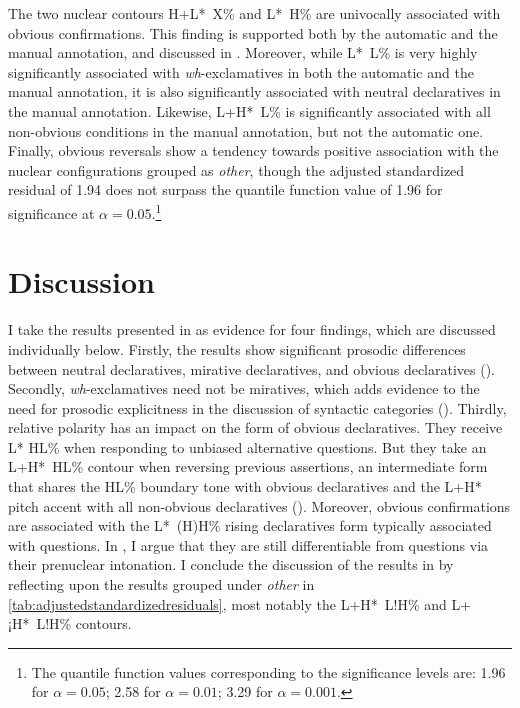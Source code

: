 The two nuclear contours H+L*~X\% and L*~H\% are univocally associated with obvious confirmations. This finding is supported both by the automatic and the manual annotation, and discussed in . Moreover, while L*~L\% is very highly significantly associated with \textit{wh}-exclamatives in both the automatic and the manual annotation, it is also significantly associated with neutral declaratives in the manual annotation. Likewise, L+H*~L\% is significantly associated with all non-obvious conditions in the manual annotation, but not the automatic one. Finally, obvious reversals show a tendency towards positive association with the nuclear configurations grouped as \textit{other}, though the adjusted standardized residual of 1.94 does not surpass the quantile function value of 1.96 for significance at $\alpha = 0.05$.\footnote{The quantile function values corresponding to the significance levels are: 1.96 for $\alpha = 0.05$; 2.58 for $\alpha = 0.01$; 3.29 for $\alpha = 0.001$.}


\section{Discussion}
\label{ch:6.3}

I take the results presented in  as evidence for four findings, which are discussed individually below. Firstly, the results show significant prosodic differences between neutral declaratives, mirative declaratives, and obvious declaratives (). Secondly, \textit{wh}-exclamatives need not be miratives, which adds evidence to the need for prosodic explicitness in the discussion of syntactic categories (). Thirdly, relative polarity has an impact on the form of obvious declaratives. They receive L* HL\% when responding to unbiased alternative questions. But they take an L+H*~HL\% contour when reversing previous assertions, an intermediate form that shares the HL\% boundary tone with obvious declaratives and the L+H* pitch accent with all non-obvious declaratives (). Moreover, obvious confirmations are associated with the L*~(H)H\% rising declaratives form typically associated with questions. In , I argue that they are still differentiable from questions via their prenuclear intonation. I conclude the discussion of the results in  by reflecting upon the results grouped under \textit{other} in \autoref{tab:adjustedstandardizedresiduals}, most notably the L+H*~L!H\% and L+¡H*~L!H\% contours. 

